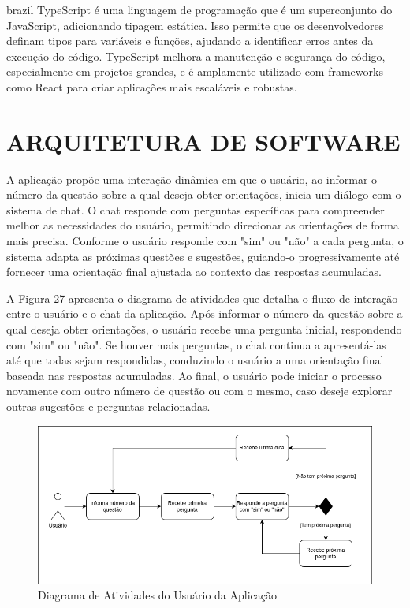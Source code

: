 \begin{otherlanguage*}{brazil}
TypeScript é uma linguagem de programação que é um superconjunto do JavaScript, adicionando tipagem estática. Isso permite que os desenvolvedores definam tipos para variáveis e funções, ajudando a identificar erros antes da execução do código. TypeScript melhora a manutenção e segurança do código, especialmente em projetos grandes, e é amplamente utilizado com frameworks como React para criar aplicações mais escaláveis e robustas.

\section{ARQUITETURA DE SOFTWARE}

A aplicação propõe uma interação dinâmica em que o usuário, ao informar o número da questão sobre a qual deseja obter orientações, inicia um diálogo com o sistema de chat. O chat responde com perguntas específicas para compreender melhor as necessidades do usuário, permitindo direcionar as orientações de forma mais precisa. Conforme o usuário responde com "sim" ou "não" a cada pergunta, o sistema adapta as próximas questões e sugestões, guiando-o progressivamente até fornecer uma orientação final ajustada ao contexto das respostas acumuladas.

A Figura 27 apresenta o diagrama de atividades que detalha o fluxo de interação entre o usuário e o chat da aplicação. Após informar o número da questão sobre a qual deseja obter orientações, o usuário recebe uma pergunta inicial, respondendo com "sim" ou "não". Se houver mais perguntas, o chat continua a apresentá-las até que todas sejam respondidas, conduzindo o usuário a uma orientação final baseada nas respostas acumuladas. Ao final, o usuário pode iniciar o processo novamente com outro número de questão ou com o mesmo, caso deseje explorar outras sugestões e perguntas relacionadas.

\begin{figure}[h!]
    \centering
            \caption{Diagrama de Atividades do Usuário da Aplicação}
            \label{fig:ModeloConceitual}
        \includegraphics[scale=0.6]{pictures/atividade1.png}
\end{figure}


\end{otherlanguage*}
